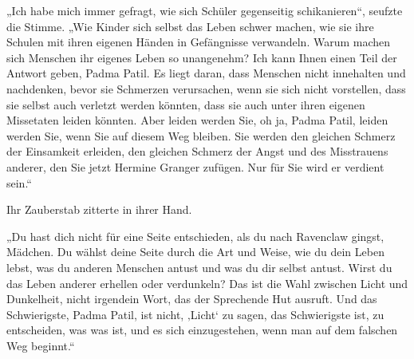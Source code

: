 „Ich habe mich immer gefragt, wie sich Schüler gegenseitig schikanieren“, seufzte die Stimme. „Wie Kinder sich selbst das Leben schwer machen, wie sie ihre Schulen mit ihren eigenen Händen in Gefängnisse verwandeln. Warum machen sich Menschen ihr eigenes Leben so unangenehm? Ich kann Ihnen einen Teil der Antwort geben, Padma Patil. Es liegt daran, dass Menschen nicht innehalten und nachdenken, bevor sie Schmerzen verursachen, wenn sie sich nicht vorstellen, dass sie selbst auch verletzt werden könnten, dass sie auch unter ihren eigenen Missetaten leiden könnten. Aber leiden werden Sie, oh ja, Padma Patil, leiden werden Sie, wenn Sie auf diesem Weg bleiben. Sie werden den gleichen Schmerz der Einsamkeit erleiden, den gleichen Schmerz der Angst und des Misstrauens anderer, den Sie jetzt Hermine Granger zufügen. Nur für Sie wird er verdient sein.“

Ihr Zauberstab zitterte in ihrer Hand.

„Du hast dich nicht für eine Seite entschieden, als du nach Ravenclaw gingst, Mädchen. Du wählst deine Seite durch die Art und Weise, wie du dein Leben lebst, was du anderen Menschen antust und was du dir selbst antust. Wirst du das Leben anderer erhellen oder verdunkeln? Das ist die Wahl zwischen Licht und Dunkelheit, nicht irgendein Wort, das der Sprechende Hut ausruft. Und das Schwierigste, Padma Patil, ist nicht, ‚Licht‘ zu sagen, das Schwierigste ist, zu entscheiden, was was ist, und es sich einzugestehen, wenn man auf dem falschen Weg beginnt.“

